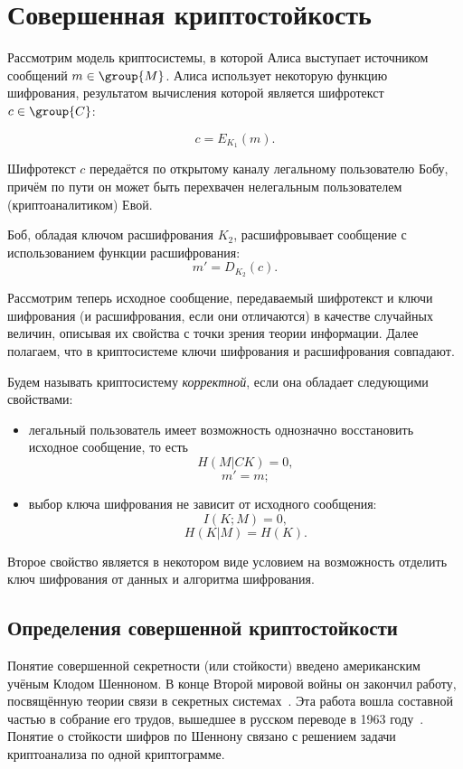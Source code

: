 \chapter{Совершенная криптостойкость}

Рассмотрим модель криптосистемы, в которой Алиса выступает источником сообщений $m \in \group{M}$. Алиса использует некоторую функцию шифрования, результатом вычисления которой является шифротекст $c \in \group{C}$:

	\[c = E_{K_1}\left(m\right).\]

Шифротекст $c$ передаётся по открытому каналу легальному пользователю Бобу, причём по пути он может быть перехвачен нелегальным пользователем (криптоаналитиком) Евой.

Боб, обладая ключом расшифрования $K_2$, расшифровывает сообщение с использованием функции расшифрования:
	\[m' = D_{K_2}\left(c \right).\]

Рассмотрим теперь исходное сообщение, передаваемый шифротекст и ключи шифрования (и расшифрования, если они отличаются) в качестве случайных величин, описывая их свойства с точки зрения теории информации. Далее полагаем, что в криптосистеме ключи шифрования и расшифрования совпадают.

Будем называть криптосистему \emph{корректной}, если она обладает следующими свойствами:
\begin{itemize}
	\item легальный пользователь имеет возможность однозначно восстановить исходное сообщение, то есть
					\[H \left( M | C K \right) = 0, \]
					\[m' = m;\]
	\item выбор ключа шифрования не зависит от исходного сообщения:
					\[ I \left( K ; M \right) = 0, \]
					\[ H \left( K | M \right) = H \left( K \right). \]
\end{itemize}

Второе свойство является в некотором виде условием на возможность отделить ключ шифрования от данных и алгоритма шифрования.

\section[Определения]{Определения совершенной криптостойкости}

Понятие совершенной секретности (или стойкости) введено американским учёным Клодом Шенноном. В конце Второй мировой войны он закончил работу, посвящённую теории связи в секретных системах~\cite{Shannon:1949:CTS}. Эта работа вошла составной частью в собрание его трудов, вышедшее в русском переводе в 1963 году~\cite{Shannon:1963}. Понятие о стойкости шифров по Шеннону связано с решением задачи криптоанализа по одной криптограмме.

